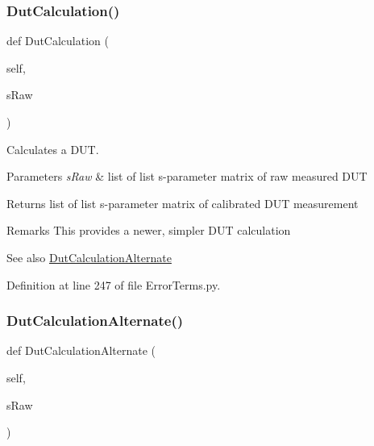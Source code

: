 \subsubsection{\texorpdfstring{Dut\+Calculation()}{DutCalculation()}}
{\footnotesize\ttfamily def Dut\+Calculation (\begin{DoxyParamCaption}\item[{}]{self,  }\item[{}]{s\+Raw }\end{DoxyParamCaption})}



Calculates a D\+UT. 


\begin{DoxyParams}{Parameters}
{\em s\+Raw} & list of list s-\/parameter matrix of raw measured D\+UT \\
\hline
\end{DoxyParams}
\begin{DoxyReturn}{Returns}
list of list s-\/parameter matrix of calibrated D\+UT measurement 
\end{DoxyReturn}
\begin{DoxyRemark}{Remarks}
This provides a newer, simpler D\+UT calculation 
\end{DoxyRemark}
\begin{DoxySeeAlso}{See also}
\hyperlink{classSignalIntegrity_1_1Measurement_1_1Calibration_1_1ErrorTerms_1_1ErrorTerms_aaa197534b553fe80ed41db445147cbc3}{Dut\+Calculation\+Alternate} 
\end{DoxySeeAlso}


Definition at line 247 of file Error\+Terms.\+py.

\mbox{\label{classSignalIntegrity_1_1Measurement_1_1Calibration_1_1ErrorTerms_1_1ErrorTerms_aaa197534b553fe80ed41db445147cbc3}} 
\subsubsection{\texorpdfstring{Dut\+Calculation\+Alternate()}{DutCalculationAlternate()}}
{\footnotesize\ttfamily def Dut\+Calculation\+Alternate (\begin{DoxyParamCaption}\item[{}]{self,  }\item[{}]{s\+Raw }\end{DoxyParamCaption})}



